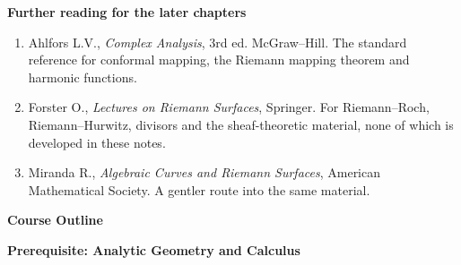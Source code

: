 \documentclass[11pt,a4paper]{article}
\theoremstyle{definition}
\begin{document}
\textbf{Further reading for the later chapters}
\begin{enumerate}
\item Ahlfors L.V., \textit{Complex Analysis}, 3rd ed. McGraw--Hill. The standard
reference for conformal mapping, the Riemann mapping theorem and harmonic
functions.
\item Forster O., \textit{Lectures on Riemann Surfaces}, Springer. For
Riemann--Roch, Riemann--Hurwitz, divisors and the sheaf-theoretic material, none of
which is developed in these notes.
\item Miranda R., \textit{Algebraic Curves and Riemann Surfaces}, American
Mathematical Society. A gentler route into the same material.
\end{enumerate}

















\pagebreak
\begin{center}
\textbf{Course Outline}
\end{center}


\textbf{Prerequisite: Analytic Geometry and Calculus}\\\\
\end{document}
